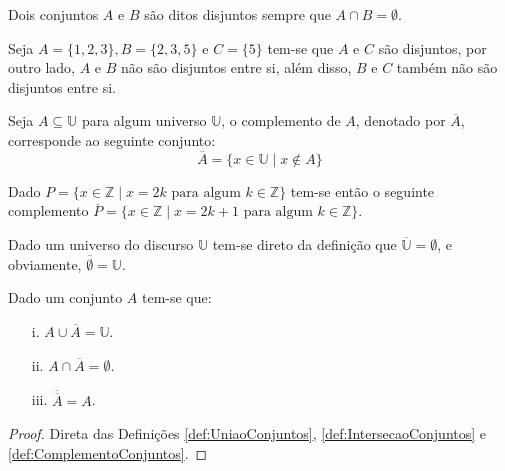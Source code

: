 \begin{definition}\label{def:ConjuntosDisjuntos}
	Dois conjuntos $A$ e $B$ são ditos disjuntos sempre que $A \cap B = \emptyset$.
\end{definition}

\begin{exem}\label{exe:ConjuntosDisjuntos}
	Seja $A = \{1, 2, 3\}, B = \{2, 3, 5\}$ e $C = \{5\}$ tem-se que $A$ e $C$ são disjuntos, por outro lado, $A$ e $B$ não são disjuntos entre si, além disso, $B$ e $C$ também não são disjuntos entre si.
\end{exem}

\begin{definition}\label{def:ComplementoConjuntos}
	Seja $A \subseteq \mathbb{U}$ para algum universo $\mathbb{U}$, o complemento de $A$, denotado por $\overline{A}$, corresponde ao seguinte conjunto:
	$$\overline{A} = \{x \in \mathbb{U} \mid x \notin A\}$$
\end{definition}

\begin{exem}\label{exe:Complemento}
	Dado $P = \{ x \in \mathbb{Z} \mid x = 2k \mbox{ para algum } k \in \mathbb{Z}\}$ tem-se então o seguinte complemento $\overline{P} = \{ x \in \mathbb{Z} \mid x = 2k + 1 \mbox{ para algum } k \in \mathbb{Z}\}$.
\end{exem}

\begin{exem}
	Dado um universo do discurso $\mathbb{U}$ tem-se direto da definição que $\overline{\mathbb{U}} = \emptyset$, e obviamente, $\overline{\emptyset} = \mathbb{U}$.
\end{exem}

\begin{theorem}\label{teo:PropriedadesComplemento}
	Dado um conjunto $A$ tem-se que:
	\begin{itemize}
		\item[i.] $A \cup \overline{A} = \mathbb{U}$.
		\item[ii.] $A \cap \overline{A} = \emptyset$.
		\item[iii.] $\overline{\overline{A}} = A$.
	\end{itemize}
\end{theorem}

\begin{proof}
	Direta das Definições \ref{def:UniaoConjuntos}, \ref{def:IntersecaoConjuntos} e \ref{def:ComplementoConjuntos}.
\end{proof}

